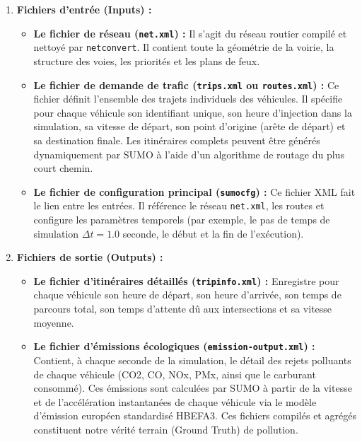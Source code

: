 \documentclass[10pt, a4paper]{article}
\providecommand{\tightlist}{}
\begin{document}
\begin{enumerate}
\def\labelenumi{\arabic{enumi}.}
\tightlist
\item
  \textbf{Fichiers d'entrée (Inputs) :}

  \begin{itemize}
  \tightlist
  \item
    \textbf{Le fichier de réseau (\texttt{net.xml}) :} Il s'agit du
    réseau routier compilé et nettoyé par \texttt{netconvert}. Il
    contient toute la géométrie de la voirie, la structure des voies,
    les priorités et les plans de feux.
  \item
    \textbf{Le fichier de demande de trafic (\texttt{trips.xml} ou
    \texttt{routes.xml}) :} Ce fichier définit l'ensemble des trajets
    individuels des véhicules. Il spécifie pour chaque véhicule son
    identifiant unique, son heure d'injection dans la simulation, sa
    vitesse de départ, son point d'origine (arête de départ) et sa
    destination finale. Les itinéraires complets peuvent être générés
    dynamiquement par SUMO à l'aide d'un algorithme de routage du plus
    court chemin.
  \item
    \textbf{Le fichier de configuration principal (\texttt{sumocfg}) :}
    Ce fichier XML fait le lien entre les entrées. Il référence le
    réseau \texttt{net.xml}, les routes et configure les paramètres
    temporels (par exemple, le pas de temps de simulation
    \(\Delta t = 1.0\) seconde, le début et la fin de l'exécution).
  \end{itemize}
\item
  \textbf{Fichiers de sortie (Outputs) :}

  \begin{itemize}
  \tightlist
  \item
    \textbf{Le fichier d'itinéraires détaillés (\texttt{tripinfo.xml})
    :} Enregistre pour chaque véhicule son heure de départ, son heure
    d'arrivée, son temps de parcours total, son temps d'attente dû aux
    intersections et sa vitesse moyenne.
  \item
    \textbf{Le fichier d'émissions écologiques
    (\texttt{emission-output.xml}) :} Contient, à chaque seconde de la
    simulation, le détail des rejets polluants de chaque véhicule (CO2,
    CO, NOx, PMx, ainsi que le carburant consommé). Ces émissions sont
    calculées par SUMO à partir de la vitesse et de l'accélération
    instantanées de chaque véhicule via le modèle d'émission européen
    standardisé HBEFA3. Ces fichiers compilés et agrégés constituent
    notre vérité terrain (Ground Truth) de pollution.
  \end{itemize}
\end{enumerate}
\end{document}
